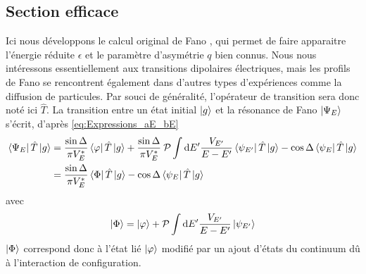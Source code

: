 \subsection{Section efficace}
Ici nous développons le calcul original de Fano , qui permet de faire apparaitre l'énergie réduite $\epsilon$ et le paramètre d'asymétrie $q$ bien connus. Nous nous intéressons essentiellement aux transitions dipolaires électriques, mais les profils de Fano se rencontrent également dans d'autres types d'expériences comme la diffusion de particules. Par souci de généralité, l'opérateur de transition sera donc noté ici $\hat{T}$. La transition entre un état initial $\ket{g}$ et la résonance de Fano $\ket{\Psi_E}$ s'écrit, d'après \ref{eq:Expressions_aE_bE}
\begin{align}
\bra{\Psi_E} \hat{T} \ket{g} & = \frac{\sin \Delta}{\pi V^*_E} \bra{\varphi} \hat{T} \ket{g} + \frac{\sin \Delta}{\pi V^*_E} \: \mathcal{P} \int \mathrm{d} E' \frac{V_{E'}}{E-E'} \bra{\psi_{E'}} \hat{T} \ket{g} - \cos \Delta \bra{\psi_E} \hat{T} \ket{g} \\
& = \frac{\sin \Delta}{\pi V^*_E} \bra{\Phi} \hat{T} \ket{g} -  \cos \Delta \bra{\psi_E} \hat{T} \ket{g} 
\end{align}
avec
\begin{equation}
\ket{\Phi} = \ket{\varphi} + \mathcal{P} \int \mathrm{d} E' \frac{V_{E'}}{E-E'} \ket{\psi_{E'}}
\end{equation}
$\ket{\Phi}$ correspond donc à l'état lié $\ket{\varphi}$ modifié par un ajout d'états du continuum dû à l'interaction de configuration.

